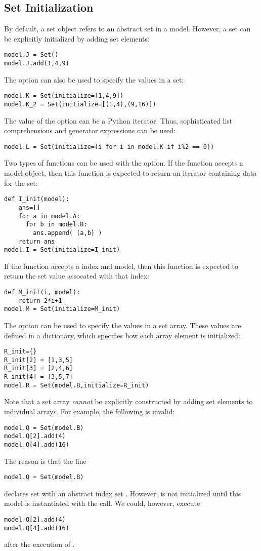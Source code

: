 \subsection{Set Initialization}

By default, a set object refers to an abstract set in a model.  
However, a set can be explicitly initialized by adding set elements:
\begin{lstlisting}
model.J = Set()
model.J.add(1,4,9)
\end{lstlisting}
The  option can also be used to specify the values in
a set:
\begin{lstlisting}
model.K = Set(initialize=[1,4,9])
model.K_2 = Set(initialize=[(1,4),(9,16)])
\end{lstlisting}
The value of the  option can be a Python iterator. 
Thus, sophisticated list comprehensions and generator expressions can be used:
\begin{lstlisting}
model.L = Set(initialize=(i for i in model.K if i%2 == 0))
\end{lstlisting}

Two types of functions can be used with the  option.  If the
function accepts a model object, then this function is expected to return
an iterator containing data for the set:
\begin{lstlisting}
def I_init(model):
    ans=[]
    for a in model.A:
      for b in model.B:
        ans.append( (a,b) )
    return ans
model.I = Set(initialize=I_init)
\end{lstlisting}
If the function accepts a index and model, then this function is expected to return the set value assocated with that index:
\begin{lstlisting}
def M_init(i, model):
    return 2*i+1
model.M = Set(initialize=M_init)
\end{lstlisting}

The  option can be used to specify the values in
a set array.  These values are defined in a dictionary, which 
specifies how each array element is initialized:
\begin{lstlisting}
R_init={}
R_init[2] = [1,3,5]
R_init[3] = [2,4,6]
R_init[4] = [3,5,7]
model.R = Set(model.B,initialize=R_init)
\end{lstlisting}
Note that a set array {\it cannot} be explicitly constructed by adding set elements to individual arrays.  For example, the following is invalid:
\begin{lstlisting}
model.Q = Set(model.B)
model.Q[2].add(4)
model.Q[4].add(16)
\end{lstlisting}
The reason is that the line
\begin{lstlisting}
model.Q = Set(model.B)
\end{lstlisting}
declares set  with an abstract index set .  However,  is not initialized until this model is instantiated with the  call. We could, however, execute 
\begin{lstlisting}
model.Q[2].add(4)
model.Q[4].add(16)
\end{lstlisting}
after the execution of .

